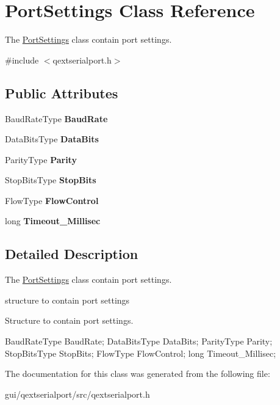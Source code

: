 \hypertarget{structPortSettings}{}\section{Port\+Settings Class Reference}
\label{structPortSettings}


The \hyperlink{structPortSettings}{Port\+Settings} class contain port settings.  




{\ttfamily \#include $<$qextserialport.\+h$>$}

\subsection*{Public Attributes}
\begin{DoxyCompactItemize}
\item 
\mbox{\label{structPortSettings_abe617f3545d6be4587e1a0700a0b0e5b}} 
Baud\+Rate\+Type {\bfseries Baud\+Rate}
\item 
\mbox{\label{structPortSettings_a9ec9d5a304b2ac8d3a100d07bce7c0b6}} 
Data\+Bits\+Type {\bfseries Data\+Bits}
\item 
\mbox{\label{structPortSettings_a8d0bfbdcb40e9e3919e3f9829ae72582}} 
Parity\+Type {\bfseries Parity}
\item 
\mbox{\label{structPortSettings_a0752c70eb7e12f02ddf59739a056b04c}} 
Stop\+Bits\+Type {\bfseries Stop\+Bits}
\item 
\mbox{\label{structPortSettings_a10720f6217b8d8b90c326ea030c43e30}} 
Flow\+Type {\bfseries Flow\+Control}
\item 
\mbox{\label{structPortSettings_a7147addae7fce6e8e4b302014967a0db}} 
long {\bfseries Timeout\+\_\+\+Millisec}
\end{DoxyCompactItemize}


\subsection{Detailed Description}
The \hyperlink{structPortSettings}{Port\+Settings} class contain port settings. 

structure to contain port settings

Structure to contain port settings.


\begin{DoxyCode}
BaudRateType BaudRate;
DataBitsType DataBits;
ParityType Parity;
StopBitsType StopBits;
FlowType FlowControl;
\textcolor{keywordtype}{long} Timeout\_Millisec;
\end{DoxyCode}
 

The documentation for this class was generated from the following file\+:\begin{DoxyCompactItemize}
\item 
gui/qextserialport/src/qextserialport.\+h\end{DoxyCompactItemize}
